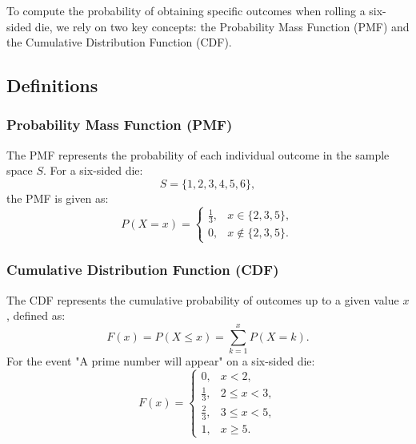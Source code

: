 \documentclass[journal]{IEEEtran}
\begin{document}
To compute the probability of obtaining specific outcomes when rolling a six-sided die, we rely on two key concepts: the Probability Mass Function (PMF) and the Cumulative Distribution Function (CDF).

\subsection*{Definitions}
\subsubsection*{Probability Mass Function (PMF)}
The PMF represents the probability of each individual outcome in the sample space \( S \). For a six-sided die:
\[
S = \{1, 2, 3, 4, 5, 6\},
\]
the PMF is given as:
\[
P(X = x) = 
\begin{cases} 
\frac{1}{3}, & x \in \{2, 3, 5\}, \\ 
0, & x \notin \{2, 3, 5\}.
\end{cases}
\]

\subsubsection*{Cumulative Distribution Function (CDF)}
The CDF represents the cumulative probability of outcomes up to a given value \( x \), defined as:
\[
F(x) = P(X \leq x) = \sum_{k=1}^{x} P(X = k).
\]
For the event "A prime number will appear" on a six-sided die:
\[
F(x) = 
\begin{cases} 
0, & x < 2, \\
\frac{1}{3}, & 2 \leq x < 3, \\
\frac{2}{3}, & 3 \leq x < 5, \\
1, & x \geq 5.
\end{cases}
\]
\end{document}
